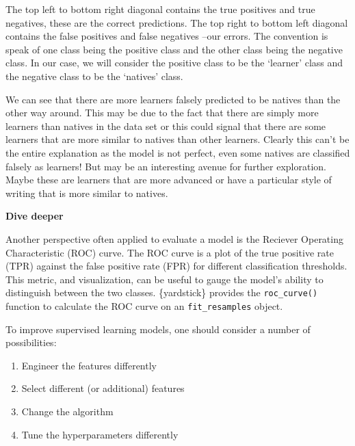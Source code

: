 \documentclass[
  letterpaper,
  krantz1]{latex/krantz-mod}
\providecommand{\tightlist}{%
  \setlength{\itemsep}{0pt}\setlength{\parskip}{0pt}}\usepackage{longtable,booktabs,array}
\theoremstyle{definition}
\theoremstyle{definition}
\theoremstyle{remark}
\begin{document}
The top left to bottom right diagonal contains the true positives and
true negatives, these are the correct predictions. The top right to
bottom left diagonal contains the false positives and false negatives
--our errors. The convention is speak of one class being the positive
class and the other class being the negative class. In our case, we will
consider the positive class to be the `learner' class and the negative
class to be the `natives' class.

We can see that there are more learners falsely predicted to be natives
than the other way around. This may be due to the fact that there are
simply more learners than natives in the data set or this could signal
that there are some learners that are more similar to natives than other
learners. Clearly this can't be the entire explanation as the model is
not perfect, even some natives are classified falsely as learners! But
may be an interesting avenue for further exploration. Maybe these are
learners that are more advanced or have a particular style of writing
that is more similar to natives.

\begin{tcolorbox}[enhanced jigsaw, leftrule=.75mm, colframe=quarto-callout-color-frame, left=2mm, colback=white, toprule=.15mm, breakable, arc=.35mm, opacityback=0, bottomrule=.15mm, rightrule=.15mm]

\textbf{ Dive deeper}

Another perspective often applied to evaluate a model is the Reciever
Operating Characteristic (ROC) curve. The ROC curve is a plot of the
true positive rate (TPR) against the false positive rate (FPR) for
different classification thresholds. This metric, and visualization, can
be useful to gauge the model's ability to distinguish between the two
classes. \{yardstick\} provides the \texttt{roc\_curve()} function to
calculate the ROC curve on an \texttt{fit\_resamples} object.

\end{tcolorbox}

To improve supervised learning models, one should consider a number of
possibilities:

\begin{enumerate}
\def\labelenumi{\arabic{enumi}.}
\tightlist
\item
  Engineer the features differently
\item
  Select different (or additional) features
\item
  Change the algorithm
\item
  Tune the hyperparameters differently
\end{enumerate}
\end{document}
